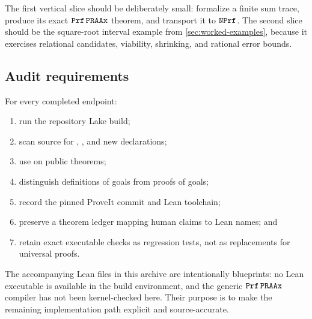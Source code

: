The first vertical slice should be deliberately small: formalize a finite sum
trace, produce its exact \(\texttt{Prf}\,\texttt{PRAAx}\) theorem, and transport it to
\(\texttt{NPrf}\).  The second slice should be the square-root interval example from
\cref{sec:worked-examples}, because it exercises relational candidates,
viability, shrinking, and rational error bounds.

\subsection{Audit requirements}

For every completed endpoint:

\begin{enumerate}
\item run the repository Lake build;
\item scan source for , , and new 
      declarations;
\item use  on public theorems;
\item distinguish definitions of goals from proofs of goals;
\item record the pinned ProveIt commit and Lean toolchain;
\item preserve a theorem ledger mapping human claims to Lean names; and
\item retain exact executable checks as regression tests, not as replacements
      for universal proofs.
\end{enumerate}

The accompanying Lean files in this archive are intentionally blueprints: no
Lean executable is available in the build environment, and the generic
\(\texttt{Prf}\,\texttt{PRAAx}\) compiler has not been kernel-checked here.  Their purpose is
to make the remaining implementation path explicit and source-accurate.
